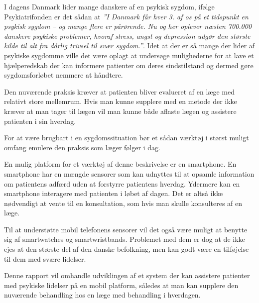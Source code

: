 


I dagens Danmark lider mange danskere af en psykisk sygdom, ifølge Psykiatrifonden er det sådan at \textit{''I Danmark får hver 3. af os på et tidspunkt en psykisk sygdom – og mange flere er pårørende. 
Nu og her oplever næsten 700.000 danskere psykiske problemer, hvoraf stress, angst og depression udgør den største kilde til alt fra dårlig trivsel til svær sygdom.''}\cite{psykiatrifonden}.
Idet at der er så mange der lider af psykiske sygdomme ville det være oplagt at undersøge mulighederne for at lave et hjælperedskab der kan informere patienter om deres sindstilstand og dermed gøre sygdomsforløbet nemmere at håndtere.

Den nuværende praksis kræver at patienten bliver evalueret af en læge med relativt store mellemrum.
Hvis man kunne supplere med en metode der ikke kræver at man tager til lægen vil man kunne både aflaste lægen og assistere patienten i sin hverdag.

For at være brugbart i en sygdomssituation bør et sådan værktøj i størst muligt omfang emulere den praksis som læger følger i dag.

En mulig platform for et værktøj af denne beskrivelse er en smartphone.
En smartphone har en mængde sensorer som kan udnyttes til at opsamle information om patientens adfærd uden at forstyrre patientens hverdag.
Ydermere kan en smartphone interagere med patienten i løbet af dagen. 
Det er altså ikke nødvendigt at vente til en konsultation, som hvis man skulle konsulteres af en læge.

Til at understøtte mobil telefonens sensorer vil det også være muligt at benytte sig af smartwatches og smartwristbands.
Problemet med dem er dog at de ikke ejes at den største del af den danske befolkning, men kan godt være en tilføjelse til dem med svære lidelser.

Denne rapport vil omhandle udviklingen af et system der kan assistere patienter med psykiske lidelser på en mobil platform, således at man kan supplere den nuværende behandling hos en læge med behandling i hverdagen.

